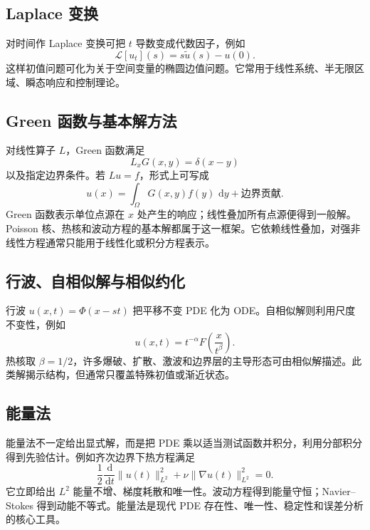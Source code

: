 \documentclass[cn,hazy,blue,11pt,normal]{elegantnote}
\numberwithin{equation}{section}
\newcommand{\dd}{\,\mathrm d}
\begin{document}
\subsection{Laplace 变换}

对时间作 Laplace 变换可把 $t$ 导数变成代数因子，例如
\begin{equation}
 \mathcal L[u_t](s)=s\widetilde u(s)-u(0).
\end{equation}
这样初值问题可化为关于空间变量的椭圆边值问题。它常用于线性系统、半无限区域、瞬态响应和控制理论。

\subsection{Green 函数与基本解方法}

对线性算子 $L$，Green 函数满足
\begin{equation}
 L_xG(x,y)=\delta(x-y)
\end{equation}
以及指定边界条件。若 $Lu=f$，形式上可写成
\begin{equation}
 u(x)=\int_\Omega G(x,y)f(y)\,\dd y
 +\text{边界贡献}.
\end{equation}
Green 函数表示单位点源在 $x$ 处产生的响应；线性叠加所有点源便得到一般解。Poisson 核、热核和波动方程的基本解都属于这一框架。它依赖线性叠加，对强非线性方程通常只能用于线性化或积分方程表示。

\subsection{行波、自相似解与相似约化}

行波 $u(x,t)=\Phi(x-st)$ 把平移不变 PDE 化为 ODE。自相似解则利用尺度不变性，例如
\begin{equation}
 u(x,t)=t^{-\alpha}F\left(\frac{x}{t^\beta}\right).
\end{equation}
热核取 $\beta=1/2$，许多爆破、扩散、激波和边界层的主导形态可由相似解描述。此类解揭示结构，但通常只覆盖特殊初值或渐近状态。

\subsection{能量法}

能量法不一定给出显式解，而是把 PDE 乘以适当测试函数并积分，利用分部积分得到先验估计。例如齐次边界下热方程满足
\begin{equation}
 \frac12\frac{\dd}{\dd t}\|u(t)\|_{L^2}^2
 +\nu\|\nabla u(t)\|_{L^2}^2=0.
\end{equation}
它立即给出 $L^2$ 能量不增、梯度耗散和唯一性。波动方程得到能量守恒；Navier--Stokes 得到动能不等式。能量法是现代 PDE 存在性、唯一性、稳定性和误差分析的核心工具。
\end{document}
